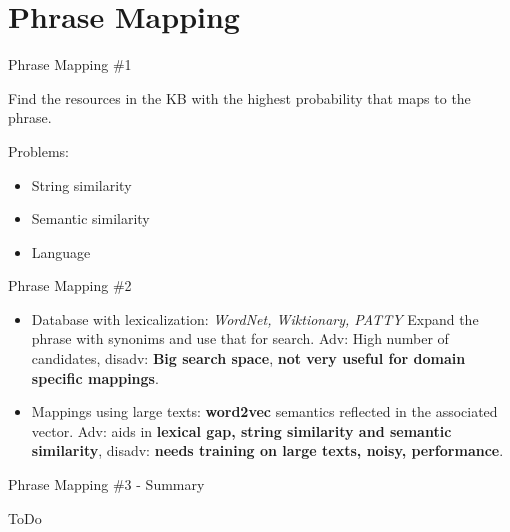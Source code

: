 \documentclass{beamer}
\begin{document}
\section{Phrase Mapping}

\begin{frame}{Phrase Mapping \#1}
  \begin{card}
    Find the resources in the KB with the highest probability that maps to the phrase.
  \end{card}
  \begin{card}
    Problems:
    \begin{itemize}
      \item String similarity
      \item Semantic similarity
      \item Language
    \end{itemize}
  \end{card}
\end{frame}


\begin{frame}{Phrase Mapping \#2}
  \begin{card}
    \begin{itemize}
      \item Database with lexicalization: \textit{WordNet, Wiktionary, PATTY} Expand the phrase with synonims and use that for search. Adv: High number of candidates, disadv: \textbf{Big search space}, \textbf{not very useful for domain specific mappings}.
      \item Mappings using large texts: \textbf{word2vec} semantics reflected in the associated vector. Adv: aids in \textbf{lexical gap, string similarity and semantic similarity}, disadv: \textbf{needs training on large texts, noisy, performance}.
    \end{itemize}
  \end{card}
\end{frame}


\begin{frame}{Phrase Mapping \#3 - Summary}
  \begin{card}
    ToDo
  \end{card}
\end{frame}
\end{document}
